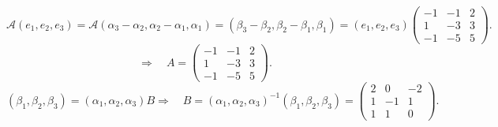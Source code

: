 \documentclass{article}
\begin{document}
\begin{enumerate}
    \[
        \mathcal{A}(e_1,e_2,e_3)
        =\mathcal{A}(\alpha_3-\alpha_2,\alpha_2-\alpha_1,\alpha_1)
        =(\beta_3-\beta_2,\beta_2-\beta_1,\beta_1)
        =(e_1,e_2,e_3)
        \begin{pmatrix}
            -1 & -1 & 2 \\
            1 & -3 & 3 \\
            -1 & -5 & 5
        \end{pmatrix}.
    \]
    \[
        \Rightarrow\quad
        A=\begin{pmatrix}
            -1 & -1 & 2 \\
            1 & -3 & 3 \\
            -1 & -5 & 5
        \end{pmatrix}.
    \]
    \[
        (\beta_1,\beta_2,\beta_3)=(\alpha_1,\alpha_2,\alpha_3)B
        \Rightarrow\quad
        B={(\alpha_1,\alpha_2,\alpha_3)}^{-1} (\beta_1,\beta_2,\beta_3)
        =\begin{pmatrix}
            2 & 0 & -2\\
            1 & -1 & 1\\
            1 & 1 & 0
        \end{pmatrix}.
    \]
\end{enumerate}
\end{document}
